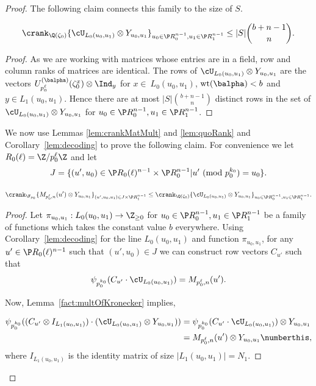 \begin{proof}
The following claim connects this family to the size of $S$.

\begin{claim}\label{claim:set1}
{\em $$\crank_{\Q(\zeta_0)} \{\cU_{L_{0}(u_0,u_1)}\otimes Y_{u_0,u_1}\}_{u_0\in \P R_0^{n-1},u_1\in \P R_1^{n-1}} \le |S|\binom{b+n-1}{n}.$$}
\end{claim}
\begin{proof}
As we are working with matrices whose entries are in a field, row and column ranks of matrices are identical. The rows of $\cU_{L_{0}(u_0,u_1)}\otimes Y_{u_0,u_1}$ are the vectors $U_{p_0^\ell}^{(\balpha)}(\zeta_0^x)\otimes \Ind_y$ for $x\in~L_0(u_0,u_1)$, $\text{wt}(\balpha)<b$ and $y\in L_1(u_0,u_1)$. Hence there are at most $|S|\binom{b+n-1}{n}$ distinct rows in the set of $\cU_{L_{0}(u_0,u_1)}\otimes Y_{u_0,u_1}$ for $u_0\in \P R_0^{n-1},u_1\in \P R_1^{n-1}$.
\end{proof}

We now use Lemmas \ref{lem:crankMatMult} and \ref{lem:quoRank} and Corollary~\ref{lem:decoding} to prove the following claim. For convenience we let $R_0(\ell)=\Z/p_0^\ell\Z$ and let 
$$J=\{(u',u_0)\in \P R_0(\ell)^{n-1}\times \P R_0^{n-1}| u' \text{ (mod }p_0^{k_0}\text{)}=u_0\}.$$

\begin{claim}\label{claim:set2}
{\em $$\crank_{\F_{p_0}} \{M_{p_0^\ell,n}(u')\otimes Y_{u_0,u_1}\}_{(u',u_0,u_1)\in J\times \P R_1^{n-1}}\le \crank_{\Q(\zeta_0)} \{\cU_{L_{0}(u_0,u_1)}\otimes Y_{u_0,u_1}\}_{u_0\in \P R_0^{n-1},u_1\in \P R_1^{n-1}}.$$}
\end{claim}
\begin{proof}
Let $\pi_{u_0,u_1}:L_0(u_0,u_1)\rightarrow \Z_{\ge 0}$ for $u_0\in \P R_0^{n-1},u_1\in \P R_1^{n-1}$ be a family of functions which takes the constant value $b$ everywhere. Using Corollary~\ref{lem:decoding} for the line $L_0(u_0,u_1)$ and function $\pi_{u_0,u_1}$, for any $u' \in \P R_0(\ell)^{n-1}$ such that $(u',u_0)\in J$ we can construct row vectors $C_{u'}$ such that 
$$\psi_{p_0^{k_0}}(C_{u'}\cdot \cU_{L_{0}(u_0,u_1)})=M_{p_0^\ell,n}(u').$$ 

Now, Lemma~\ref{fact:multOfKronecker} implies,

\begin{align*}\label{eq:long}
\psi_{p_0^{k_0}}((C_{u'}\otimes I_{L_1(u_0,u_1)})\cdot (\cU_{L_{0}(u_0,u_1)}\otimes Y_{u_0,u_1}))&= \psi_{p_0^{k_0}}(C_{u'}\cdot \cU_{L_{0}(u_0,u_1)})\otimes Y_{u_0,u_1}\\
&= M_{p_0^{\ell},n}(u')\otimes Y_{u_0,u_1} \numberthis,
\end{align*}
where $I_{L_1(u_0,u_1)}$ is the identity matrix of size $|L_1(u_0,u_1)|=N_1$.


\end{proof}
\end{proof}
